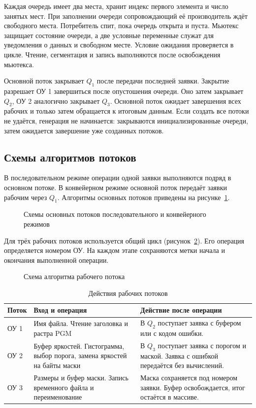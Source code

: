 Каждая очередь имеет два места, хранит индекс первого элемента и число занятых мест. При заполнении очереди сопровождающий её производитель ждёт свободного места. Потребитель спит, пока очередь открыта и пуста. Мьютекс защищает состояние очереди, а две условные переменные служат для уведомления о данных и свободном месте. Условие ожидания проверяется в цикле. Чтение, сегментация и запись выполняются после освобождения мьютекса.

Основной поток закрывает \(Q_1\) после передачи последней заявки. Закрытие разрешает ОУ 1 завершиться после опустошения очереди. Оно затем закрывает \(Q_2\), ОУ 2 аналогично закрывает \(Q_3\). Основной поток ожидает завершения всех рабочих и только затем обращается к итоговым данным. Если создать все потоки не удаётся, генерация не начинается: закрываются инициализированные очереди, затем ожидается завершение уже созданных потоков.

\clearpage\subsection{Схемы алгоритмов потоков}
В последовательном режиме операции одной заявки выполняются подряд в основном потоке. В конвейерном режиме основной поток передаёт заявки рабочим через \(Q_1\). Алгоритмы основных потоков приведены на рисунке~\ref{fig:main}.

\begin{figure}[H]\centering

\caption{Схемы основных потоков последовательного и конвейерного режимов}\label{fig:main}
\end{figure}

\clearpage
Для трёх рабочих потоков используется общий цикл (рисунок~\ref{fig:worker}). Его операция определяется номером ОУ. На каждом этапе сохраняются метки начала и окончания выполненной операции.

\begin{figure}[H]\centering

\caption{Схема алгоритма рабочего потока}\label{fig:worker}
\end{figure}

\begin{table}[H]\caption{Действия рабочих потоков}\label{tab:devices}
\centering
\begin{tabularx}{\textwidth}{|l|>{\raggedright\arraybackslash}X|>{\raggedright\arraybackslash}X|}\hline
Поток & Вход и операция & Действие после операции\\\hline
ОУ 1 & Имя файла. Чтение заголовка и растра PGM &
В \(Q_2\) поступает заявка с буфером или с кодом ошибки.\\\hline
ОУ 2 & Буфер яркостей. Гистограмма, выбор порога, замена яркостей на байты маски &
В \(Q_3\) поступает заявка с порогом и маской. Заявка с ошибкой передаётся без вычислений.\\\hline
ОУ 3 & Размеры и буфер маски. Запись временного файла и переименование &
Маска сохраняется под номером заявки. Буфер освобождается, итог остаётся в массиве.\\\hline
\end{tabularx}
\end{table}


